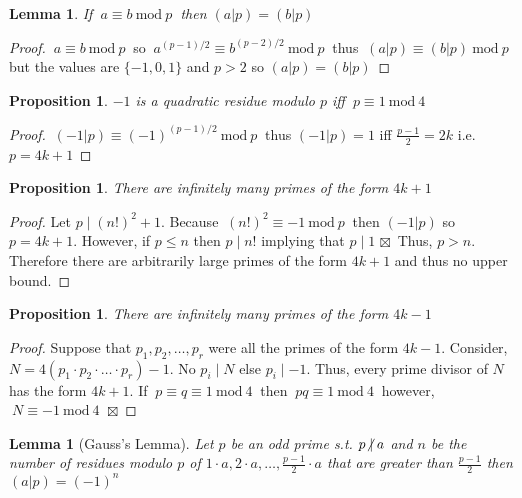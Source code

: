 \documentclass[12pt]{extarticle}
\renewcommand\qedsymbol{$\square$}
\newcommand{\cont}{$\boxtimes$}
\newcommand{\divides}{\mid}
\newcommand{\ndivides}{\centernot \mid}
\newtheorem{lemma}[theorem]{Lemma}
\newtheorem{proposition}[theorem]{Proposition}
\newenvironment{lproof}{\begin{proof} \renewcommand{\qedsymbol}{}}{\end{proof}}
\renewcommand{\mod}[3]{\: #1 \equiv #2 \: \mathrm{mod} \: #3 \:}
\begin{document}
\begin{lemma}
\label{congruentlegs}
If $\mod{a}{b}{p}$ then $(a|p) = (b|p)$
\end{lemma}

\begin{lproof}
$\mod{a}{b}{p}$ so $\mod{a^{(p-1)/2}}{b^{(p-2)/2}}{p}$ thus $\mod{(a|p)}{(b|p)}{p}$ but the values are $\{-1,0,1\}$ and $p > 2$ so $(a|p) = (b|p)$ 
\end{lproof}

\begin{proposition}
\label{quadresneg1}
$-1$ is a quadratic residue modulo $p$ iff $\mod{p}{1}{4}$
\end{proposition}

\begin{lproof}
$\mod{(-1|p)}{(-1)^{(p-1)/2}}{p}$ thus $(-1|p) = 1$ iff $\frac{p-1}{2} = 2k$ i.e. $p = 4k + 1$
\end{lproof}

\begin{proposition}
There are infinitely many primes of the form $4k + 1$
\end{proposition}

\begin{lproof}
Let $p \divides (n!)^2 + 1$. Because $\mod{(n!)^2}{-1}{p}$ then $(-1|p)$ so $p = 4k + 1$. However, if $p \le n$ then $p \divides n!$ implying that $p \divides 1$ \cont\ Thus, $p > n$. Therefore there are arbitrarily large primes of the form $4k + 1$ and thus no upper bound. 
\end{lproof}

\begin{proposition}
There are infinitely many primes of the form $4k - 1$
\end{proposition}

\begin{lproof}
Suppose that $p_1, p_2, \dots , p_r$ were all the primes of the form $4k - 1$. Consider, \\ $N = 4 (p_1 \cdot p_2 \cdot \ldots \cdot p_r) - 1$. No $p_i \divides N$ else $p_i \divides -1$. Thus, every prime divisor of $N$ has the form $4k + 1$. If $\mod{p \equiv q}{1}{4}$ then $\mod{pq}{1}{4}$ however, $\mod{N}{-1}{4}$ \cont 
\end{lproof}

\newpage

\begin{lemma}[Gauss's Lemma]
Let $p$ be an odd prime s.t. $p \ndivides a$ and $n$ be the number of residues modulo $p$ of $1 \cdot a, 2 \cdot a, \dots , \frac{p-1}{2} \cdot a$ that are greater than $\frac{p-1}{2}$ then $(a|p) = (-1)^n$
\end{lemma}
\end{document}
